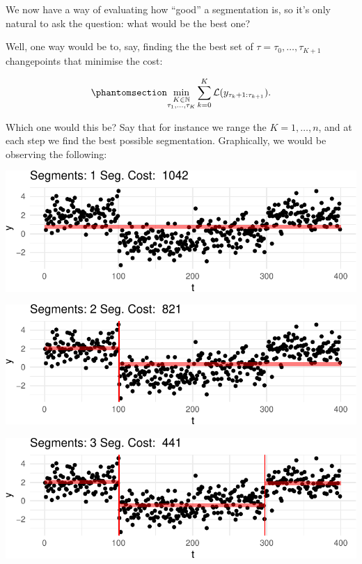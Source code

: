 \documentclass[
  letterpaper,
  DIV=11,
  numbers=noendperiod]{scrreprt}
\begin{document}
We now have a way of evaluating how ``good'' a segmentation is, so it's
only natural to ask the question: what would be the best one?

Well, one way would be to, say, finding the the best set of
\(\tau = \tau_0, \dots, \tau_{K+1}\) changepoints that minimise the
cost:

\begin{equation}\phantomsection\label{eq-segment_cost}{
\min_{\substack{K \in \mathbb{N}\\ \tau_1, \dots, \tau_K}} \sum_{k = 0}^K \mathcal{L}(y_{\tau_k+1:\tau_{k+1}}).
}\end{equation}

Which one would this be? Say that for instance we range the
\(K = 1, \dots, n\), and at each step we find the best possible
segmentation. Graphically, we would be observing the following:

\includegraphics{3_multiple_changes_files/figure-pdf/unnamed-chunk-5-1.pdf}

\includegraphics{3_multiple_changes_files/figure-pdf/unnamed-chunk-5-2.pdf}

\includegraphics{3_multiple_changes_files/figure-pdf/unnamed-chunk-5-3.pdf}
\end{document}
